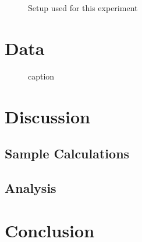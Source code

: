 \documentclass[11pt, titlepage]{article}
\begin{document}
\pagebreak
\begin{figure}[!ht]
\centering
\caption{Setup used for this experiment}
\end{figure}

\pagebreak
\section*{Data}
\begin{center}

\begin{figure}[!ht]
\caption{caption}
\end{figure}
\end{center}

\pagebreak
\section*{Discussion}
\subsection*{Sample Calculations}

\subsection*{Analysis}

\section*{Conclusion}
\end{document}
